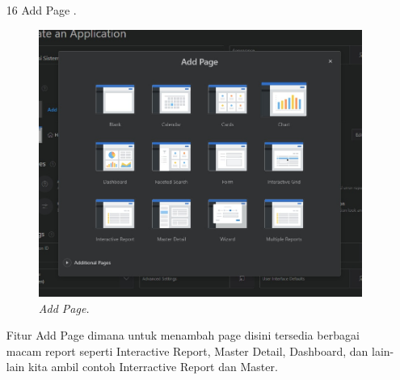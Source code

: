 \begin{enumerate}
\item[16]Add Page .
\begin{figure}[!htbp]
    \begin{center}
    \includegraphics[scale=0.5]{figures/add_page.jpg}
    \caption{\textit{Add Page.}}
    \end{center}
\end{figure}
\par Fitur Add Page dimana untuk menambah page disini tersedia berbagai macam report seperti Interactive Report, Master Detail, Dashboard, dan lain-lain kita ambil contoh Interractive Report dan Master.


\end{enumerate}
